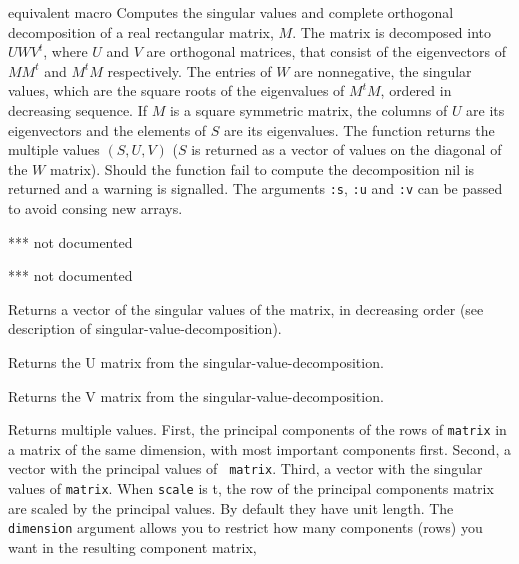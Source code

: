 \begin{description}

\item{}
equivalent macro  Computes the singular values and complete
orthogonal decomposition of a real rectangular matrix, $M$. The matrix
is decomposed into $U W V^t$, where $U$ and $V$ are orthogonal
matrices, that consist of the eigenvectors of $M M^t$ and $M^t M$
respectively.  The entries of $W$ are nonnegative, the singular
values, which are the square roots of the eigenvalues of $M^t M$,
ordered in decreasing sequence.  If $M$ is a square symmetric matrix,
the columns of $U$ are its eigenvectors and the elements of $S$ are
its eigenvalues.  The function returns the multiple values $(S,U,V)$
($S$ is returned as a vector of values on the diagonal of the $W$
matrix). Should the function fail to compute the decomposition nil is
returned and a warning is signalled.  The arguments {\tt :s}, {\tt :u}
and {\tt :v} can be passed to avoid consing new arrays.

*** not documented

*** not documented

\item{}
Returns a vector of the singular values of the matrix, in decreasing
order (see description of singular-value-decomposition).

\item{}
Returns the U matrix from the singular-value-decomposition.

\item{}
Returns the V matrix from the singular-value-decomposition.

\item{}
Returns multiple values.  First, the principal components of the rows
of {\tt matrix} in a matrix of the same dimension, with most important
components first.  Second, a vector with the principal values of {\tt
matrix}.  Third, a vector with the singular values of {\tt matrix}.
When {\tt scale} is t, the row of the principal components matrix are
scaled by the principal values. By default they have unit length.  The
{\tt dimension} argument allows you to restrict how many components
(rows) you want in the resulting component matrix,


\end{description}
